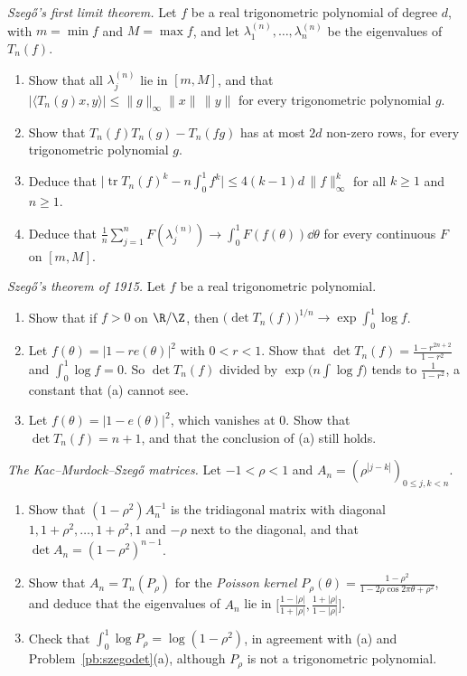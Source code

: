 \begin{exercise}[$\star\star\star$]\label{pb:szego}
\emph{Szegő's first limit theorem.} Let $f$ be a real trigonometric polynomial of degree $d$, with $m=\min f$ and $M=\max f$, and let $\lambda_1^{(n)},\dots,\lambda_n^{(n)}$ be the
eigenvalues of $T_n(f)$.
\begin{enumerate}[label=(\alph*)]
\item Show that all $\lambda_j^{(n)}$ lie in $[m,M]$, and that $|\langle T_n(g)x,y\rangle|\le\|g\|_\infty\|x\|\,\|y\|$ for every trigonometric polynomial $g$.
\item Show that $T_n(f)T_n(g)-T_n(fg)$ has at most $2d$ non-zero rows, for every trigonometric polynomial $g$.
\item Deduce that $\bigl|\operatorname{tr}T_n(f)^k-n\int_0^1f^k\bigr|\le4(k-1)d\,\|f\|_\infty^k$ for all $k\ge1$ and $n\ge1$.
\item Deduce that $\frac1n\sum_{j=1}^nF(\lambda_j^{(n)})\to\int_0^1F(f(\theta))\dd\theta$ for every continuous $F$ on $[m,M]$.
\end{enumerate}
\end{exercise}

\begin{exercise}[$\star\star$]\label{pb:szegodet}
\emph{Szegő's theorem of 1915.} Let $f$ be a real trigonometric polynomial.
\begin{enumerate}[label=(\alph*)]
\item Show that if $f>0$ on $\R/\Z$, then $\bigl(\det T_n(f)\bigr)^{1/n}\to\exp\int_0^1\log f$.
\item Let $f(\theta)=|1-re(\theta)|^2$ with $0<r<1$. Show that $\det T_n(f)=\frac{1-r^{2n+2}}{1-r^2}$ and $\int_0^1\log f=0$. So $\det T_n(f)$ divided by $\exp\bigl(n\int\log f\bigr)$
tends to $\frac1{1-r^2}$, a constant that (a) cannot see.
\item Let $f(\theta)=|1-e(\theta)|^2$, which vanishes at $0$. Show that $\det T_n(f)=n+1$, and that the conclusion of (a) still holds.
\end{enumerate}
\end{exercise}

\begin{exercise}[$\star\star$]\label{pb:kms}
\emph{The Kac--Murdock--Szegő matrices.} Let $-1<\rho<1$ and $A_n=(\rho^{|j-k|})_{0\le j,k<n}$.
\begin{enumerate}[label=(\alph*)]
\item Show that $(1-\rho^2)A_n^{-1}$ is the tridiagonal matrix with diagonal $1,1+\rho^2,\dots,1+\rho^2,1$ and $-\rho$ next to the diagonal, and that
$\det A_n=(1-\rho^2)^{n-1}$.
\item Show that $A_n=T_n(P_\rho)$ for the \emph{Poisson kernel} $P_\rho(\theta)=\frac{1-\rho^2}{1-2\rho\cos2\pi\theta+\rho^2}$, and deduce that the eigenvalues of $A_n$ lie in
$\bigl[\frac{1-|\rho|}{1+|\rho|},\frac{1+|\rho|}{1-|\rho|}\bigr]$.
\item Check that $\int_0^1\log P_\rho=\log(1-\rho^2)$, in agreement with (a) and Problem~\ref{pb:szegodet}(a), although $P_\rho$ is not a trigonometric polynomial.
\end{enumerate}
\end{exercise}


